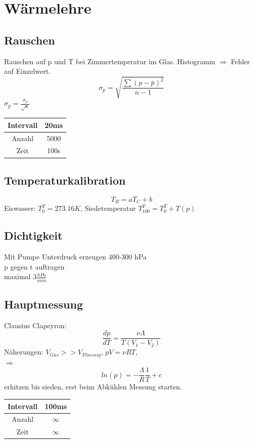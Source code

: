 \documentclass[12pt,a4paper]{article}
\author{Gruppe C14 \\ Julián Häck, Martin Koytek, Lars Wenning, Erik Zimmermann}
\begin{document}
\section{Wärmelehre}
\subsection{Rauschen}
Rauschen auf p und T bei Zimmertemperatur im Glas.
Histogramm $\Rightarrow$ Fehler auf Einzelwert.
\begin{equation}
\sigma_p = \sqrt{\frac{\sum (p-\bar{p})^2}{n-1}}
\end{equation}
$\sigma_{\bar{p}}=\frac{\sigma_p}{\sqrt{n}}$

\begin{table}[H]\centering
\begin{tabular}{|c|c|}
\hline 
Intervall & 20ms \\ 
\hline 
Anzahl & 5000 \\ 
\hline 
Zeit & 100s \\ 
\hline 
\end{tabular} 
\end{table}
\subsection{Temperaturkalibration}
\begin{equation}
T_R=aT_C+b
\end{equation}
Eiswasser: $T_0^T=273.16K$, Siedetemperatur $T_{100}^T=T_0^T+T(p)$ 
\subsection{Dichtigkeit}
Mit Pumpe Unterdruck erzeugen 400-300 hPa \\
p gegen t auftragen \\
maximal $3\frac{hPa}{min}$ \\
\subsection{Hauptmessung}
Clausius Clapeyron: 
\begin{equation}
\frac{dp}{dT}=\frac{\nu \Lambda}{T(V_1-V_2)}
\end{equation}
Näherungen: $V_{Gas} >> V_{Fluessig}$, $pV=\nu RT$,\\
$\Rightarrow$
\begin{equation}
ln(p)=-\frac{\Lambda}{R}\frac{1}{T}+c
\end{equation}
erhitzen bis sieden, erst beim Abkühlen Messung starten. 
\begin{table}[H]\centering
\begin{tabular}{|c|c|}
\hline 
Intervall & 100ms \\ 
\hline 
Anzahl & $\infty$ \\ 
\hline 
Zeit & $\infty$ \\ 
\hline 
\end{tabular} 
\end{table}
\newpage
\end{document}
